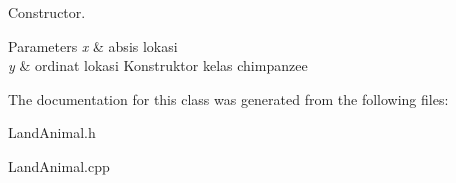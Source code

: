 Constructor. 


\begin{DoxyParams}{Parameters}
{\em x} & absis lokasi \\
\hline
{\em y} & ordinat lokasi Konstruktor kelas chimpanzee \\
\hline
\end{DoxyParams}


The documentation for this class was generated from the following files\+:\begin{DoxyCompactItemize}
\item 
Land\+Animal.\+h\item 
Land\+Animal.\+cpp\end{DoxyCompactItemize}
